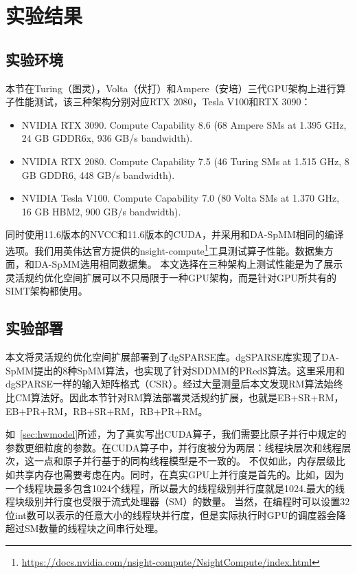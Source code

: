 \section{实验结果}
\subsection{实验环境}
本节在Turing（图灵），Volta（伏打）和Ampere（安培）三代GPU架构上进行算子性能测试，该三种架构分别对应RTX 2080，Tesla V100和RTX 3090：
\begin{itemize}
\item NVIDIA RTX 3090. Compute Capability 8.6 (68 Ampere SMs at 1.395 GHz, 24 GB GDDR6x, 936 GB/s bandwidth).
\item NVIDIA RTX 2080. Compute Capability 7.5 (46 Turing SMs at
1.515 GHz, 8 GB GDDR6, 448 GB/s bandwidth).
\item NVIDIA Tesla V100. Compute Capability 7.0 (80 Volta SMs at
1.370 GHz, 16 GB HBM2, 900 GB/s bandwidth). 
\end{itemize}
同时使用11.6版本的NVCC和11.6版本的CUDA，并采用和DA-SpMM相同的编译选项。我们用英伟达官方提供的nsight-compute\footnote{\url{https://docs.nvidia.com/nsight-compute/NsightCompute/index.html}}工具测试算子性能。数据集方面，和DA-SpMM选用相同数据集。
本文选择在三种架构上测试性能是为了展示灵活规约优化空间扩展可以不只局限于一种GPU架构，而是针对GPU所共有的SIMT架构都使用。
\subsection{实验部署}\label{sec:exp}
本文将灵活规约优化空间扩展部署到了dgSPARSE库。dgSPARSE库实现了DA-SpMM提出的8种SpMM算法，也实现了针对SDDMM的PRedS算法。这里采用和dgSPARSE一样的输入矩阵格式（CSR）。经过大量测量后本文发现RM算法始终比CM算法好。因此本节针对RM算法部署灵活规约扩展，也就是EB+SR+RM，EB+PR+RM，RB+SR+RM，RB+PR+RM。

如~\ref{sec:hwmodel}所述，为了真实写出CUDA算子，我们需要比原子并行中规定的参数更细粒度的参数。在CUDA算子中，并行度被分为两层：线程块层次和线程层次，这一点和原子并行基于的同构线程模型是不一致的。
不仅如此，内存层级比如共享内存也需要考虑在内。同时，在真实GPU上并行度是首先的。比如，因为一个线程块最多包含1024个线程，所以最大的线程级别并行度就是1024.最大的线程块级别并行度也受限于流式处理器（SM）的数量。
当然，在编程时可以设置32位int数可以表示的任意大小的线程块并行度，但是实际执行时GPU的调度器会降超过SM数量的线程块之间串行处理。

